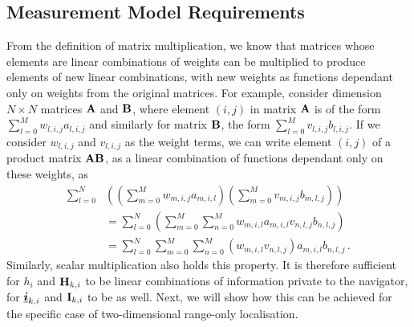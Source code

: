 \documentclass[10pt,journal,compsoc]{IEEEtran}
\theoremstyle{definition}
\theoremstyle{definition}
\theoremstyle{remark}
\begin{document}
% 
% 

\subsection{Measurement Model Requirements}
From the definition of matrix multiplication, we know that matrices whose elements are linear combinations of weights can be multiplied to produce elements of new linear combinations, with new weights as functions dependant only on weights from the original matrices. For example, consider dimension $N\times N$ matrices ${{\mathbf{A}}}$ and ${{\mathbf{B}}}$, where element $(i,j)$ in matrix ${{\mathbf{A}}}$ is of the form $\sum_{l=0}^M w_{l,i,j}a_{l,i,j}$ and similarly for matrix ${{\mathbf{B}}}$, the form $\sum_{l=0}^M v_{l,i,j}b_{l,i,j}$. If we consider $w_{l,i,j}$ and $v_{l,i,j}$ as the weight terms, we can write element $(i,j)$ of a product matrix ${{\mathbf{A}}}{{\mathbf{B}}}$, as a linear combination of functions dependant only on these weights, as
\begin{equation}
    \begin{split}
        \sum_{l=0}^N&\left(\left(\sum_{m=0}^M w_{m,i,j}a_{m,i,l}\right)\left(\sum_{m=0}^Mv_{m,i,j}b_{m,l,j}\right)\right) \\
        &=\sum_{l=0}^N\left(\sum_{m=0}^M\sum_{n=0}^M w_{m,i,l}a_{m,i,l}v_{n,l,j}b_{n,l,j}\right) \\
        &=\sum_{l=0}^N\sum_{m=0}^M\sum_{n=0}^M (w_{m,i,l}v_{n,l,j})a_{m,i,l}b_{n,l,j}\,.
    \end{split} \label{eqn:matrix_mult_weights}
\end{equation}
Similarly, scalar multiplication also holds this property. It is therefore sufficient for $h_i$ and ${{\mathbf{H}}}_{k,i}$ to be linear combinations of information private to the navigator, for ${\boldsymbol{\underline{i}}}_{k,i}$ and ${{\mathbf{I}}}_{k,i}$ to be as well. Next, we will show how this can be achieved for the specific case of two-dimensional range-only localisation.

% 
% 
\end{document}
